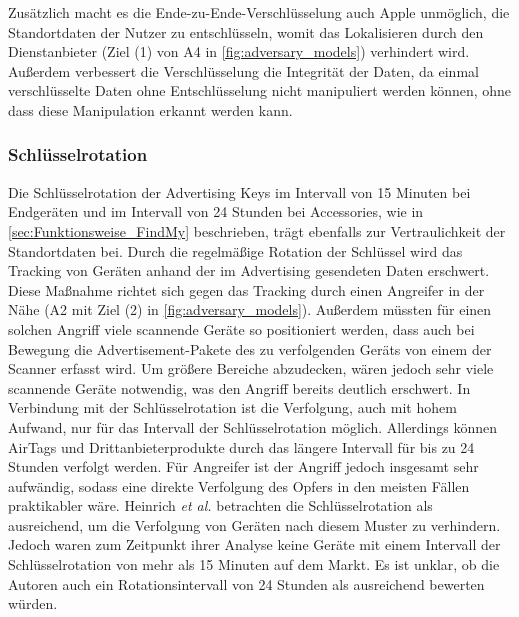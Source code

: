 Zusätzlich macht es die Ende-zu-Ende-Verschlüsselung auch Apple unmöglich, die Standortdaten der Nutzer zu entschlüsseln, womit das Lokalisieren durch den Dienstanbieter (Ziel (1) von A4 in \autoref{fig:adversary_models}) verhindert wird.
Außerdem verbessert die Verschlüsselung die Integrität der Daten, da einmal verschlüsselte Daten ohne Entschlüsselung nicht manipuliert werden können, ohne dass diese Manipulation erkannt werden kann.


\subsubsection{Schlüsselrotation}
Die Schlüsselrotation der Advertising Keys im Intervall von 15 Minuten bei Endgeräten und im Intervall von 24 Stunden bei Accessories, wie in \autoref{sec:Funktionsweise_FindMy} beschrieben, trägt ebenfalls zur Vertraulichkeit der Standortdaten bei.
Durch die regelmäßige Rotation der Schlüssel wird das Tracking von Geräten anhand der im Advertising gesendeten Daten erschwert.
Diese Maßnahme richtet sich gegen das Tracking durch einen Angreifer in der Nähe (A2 mit Ziel (2) in \autoref{fig:adversary_models}).
Außerdem müssten für einen solchen Angriff viele scannende Geräte so positioniert werden, dass auch bei Bewegung die Advertisement-Pakete des zu verfolgenden Geräts von einem der Scanner erfasst wird.
Um größere Bereiche abzudecken, wären jedoch sehr viele scannende Geräte notwendig, was den Angriff bereits deutlich erschwert.
In Verbindung mit der Schlüsselrotation ist die Verfolgung, auch mit hohem Aufwand, nur für das Intervall der Schlüsselrotation möglich.
Allerdings können AirTags und Drittanbieterprodukte durch das längere Intervall für bis zu 24 Stunden verfolgt werden.
Für Angreifer ist der Angriff jedoch insgesamt sehr aufwändig, sodass eine direkte Verfolgung des Opfers in den meisten Fällen praktikabler wäre.
Heinrich \textit{et al.} \cite{Heinrich_FindMy} betrachten die Schlüsselrotation als ausreichend, um die Verfolgung von Geräten nach diesem Muster zu verhindern.
Jedoch waren zum Zeitpunkt ihrer Analyse keine Geräte mit einem Intervall der Schlüsselrotation von mehr als 15 Minuten auf dem Markt.
Es ist unklar, ob die Autoren auch ein Rotationsintervall von 24 Stunden als ausreichend bewerten würden.